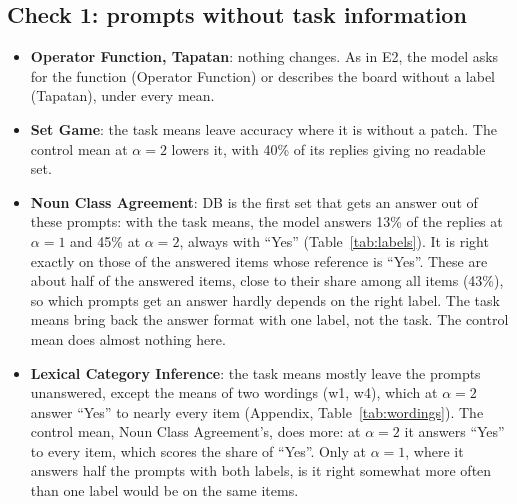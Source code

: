 \documentclass[10pt,a4paper]{article}
\begin{document}
\subsection{Check 1: prompts without task information}

\begin{table}[H]\centering\small

\caption{Check 1. Accuracy of the patched replies, flexible score, task mean = mean over the seven rule wordings' means. Items: patched items; Unp.: their unpatched accuracy; Const.: accuracy of answering every item with its most frequent label (label tasks). DB (E9) and E2's rule-style J-head and Logit-head sets on the same items and means, at $\alpha$ 1 and 2. Control mean: the control task's mean under its original prompt, at the same heads.}
\label{tab:check1}
\end{table}

\begin{itemize}
\item \textbf{Operator Function, Tapatan}: nothing changes. As in E2, the model asks for the function (Operator Function) or describes the board without a label (Tapatan), under every mean.
\item \textbf{Set Game}: the task means leave accuracy where it is without a patch. The control mean at $\alpha=2$ lowers it, with 40\% of its replies giving no readable set.
\item \textbf{Noun Class Agreement}: DB is the first set that gets an answer out of these prompts: with the task means, the model answers 13\% of the replies at $\alpha=1$ and 45\% at $\alpha=2$, always with ``Yes'' (Table~\ref{tab:labels}). It is right exactly on those of the answered items whose reference is ``Yes''. These are about half of the answered items, close to their share among all items (43\%), so which prompts get an answer hardly depends on the right label. The task means bring back the answer format with one label, not the task. The control mean does almost nothing here.
\item \textbf{Lexical Category Inference}: the task means mostly leave the prompts unanswered, except the means of two wordings (w1, w4), which at $\alpha=2$ answer ``Yes'' to nearly every item (Appendix, Table~\ref{tab:wordings}). The control mean, Noun Class Agreement's, does more: at $\alpha=2$ it answers ``Yes'' to every item, which scores the share of ``Yes''. Only at $\alpha=1$, where it answers half the prompts with both labels, is it right somewhat more often than one label would be on the same items.
\end{itemize}
\end{document}

